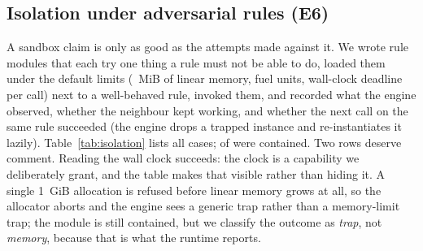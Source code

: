 \subsection{Isolation under adversarial rules (E6)}
\label{sec:eval:e6}
A sandbox claim is only as good as the attempts made against it. We wrote
\isoModules{} rule modules that each try one thing a rule must not be able
to do, loaded them under the default limits (\isoMemoryCapMiB{}~MiB of
linear memory, \isoFuel{} fuel units, \isoTimeout{} wall-clock deadline per
call) next to a well-behaved rule, invoked them, and recorded what the engine
observed, whether the neighbour kept working, and whether the next call on
the same rule succeeded (the engine drops a trapped instance and
re-instantiates it lazily). Table~\ref{tab:isolation} lists all
\isoTotal{} cases; \isoContained{} of \isoTotal{} were contained. Two rows
deserve comment. Reading the wall clock succeeds: the clock is a capability
we deliberately grant, and the table makes that visible rather than hiding
it. A single \SI{1}{GiB} allocation is refused before linear memory grows at
all, so the allocator aborts and the engine sees a generic trap rather than a
memory-limit trap; the module is still contained, but we classify the
outcome as \emph{trap}, not \emph{memory}, because that is what the runtime
reports.

\begin{table}[t]
\caption{E6: adversarial rule modules under the default limits. ``Level'' is
the rule's own return value; a trap is reported by the runtime. Every case
leaves the neighbouring rule unaffected and the next call succeeds.
Produced by \texttt{go test ./internal/engine -run Adversarial} from
\texttt{isolation/isolation.json}.}
\label{tab:isolation}
\centering\footnotesize

\end{table}

